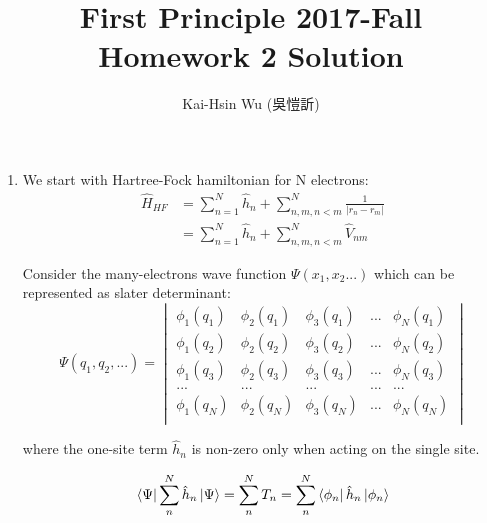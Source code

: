 \documentclass[notitlepage]{revtex4-1}
\begin{document}
\begin{CJK}{UTF8}{bsmi}
\title{First Principle 2017-Fall  Homework 2 Solution}
\author{Kai-Hsin Wu (吳愷訢)}

\maketitle

\begin{enumerate}	
	\item We start with Hartree-Fock hamiltonian for N electrons:
	\begin{align*}
		\hat{H}_{HF} &= \sum_{n=1}^{N} \hat{h}_n + \sum_{n,m,n < m}^{N} \frac{1}{|r_n - r_m|} \\
		&= \sum_{n=1}^{N} \hat{h}_n + \sum_{n,m,n < m}^{N} \hat{V}_{nm}
	\end{align*} 
	
	Consider the many-electrons wave function $\Psi(x_1,x_2...)$ which can be represented as slater determinant:	
	\begin{equation*}
		\Psi(q_1, q_2, ...) = 
		\begin{vmatrix}
			\phi_{1}(q_1) & \phi_{2}(q_1) & \phi_{3}(q_1) & ... & \phi_{N}(q_1)\\
			\phi_{1}(q_2) & \phi_{2}(q_2) & \phi_{3}(q_2) &... & \phi_{N}(q_2)\\
			\phi_{1}(q_3) & \phi_{2}(q_3) & \phi_{3}(q_3) &... & \phi_{N}(q_3)\\
			... &  ... & ... & ... & ...\\
			\phi_{1}(q_N) &  \phi_{2}(q_N) & \phi_{3}(q_N) & ... & \phi_{N}(q_N)\\
		\end{vmatrix}
	\end{equation*}
	
	where the one-site term $\hat{h}_n$ is non-zero only when acting on the single site.
	
	\begin{equation*}
		\bra{\Psi} \sum_{n}^{N} \hat{h}_n \ket{\Psi} = \sum_{n}^{N} T_n =  \sum_{n}^{N} \bra{\phi_{n}} \hat{h}_{n}  \ket{\phi_n}
	\end{equation*}
	

\end{enumerate}
\end{CJK}
\end{document}
